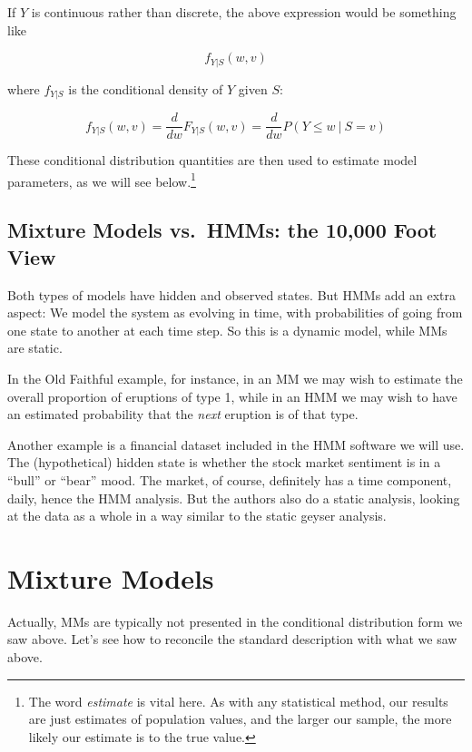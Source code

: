 \documentclass[11pt]{article}
\begin{document}
If $Y$ is continuous rather than discrete, the above expression would be
something like

\begin{equation}
f_{Y|S} (w,v) 
\end{equation}

where $f_{Y|S}$ is the conditional density of $Y$ given $S$:

\begin{equation}
f_{Y|S}(w,v) 
= \frac{d}{dw} F_{Y|S}(w,v) 
= \frac{d}{dw} P(Y \leq w ~|~ S = v)
\end{equation}

These conditional distribution quantities are then used to estimate
model parameters, as we will see below.\footnote{The word
\textit{estimate} is vital here.  As with any statistical method, our
results are just estimates of population values, and the larger our
sample, the more likely our estimate is to the true value.}

\subsection{Mixture Models vs.\ HMMs: the 10,000 Foot View}

Both types of models have hidden and observed states.  But HMMs add an
extra aspect:  We model the system as evolving in time, with
probabilities of going from one state to another at each time step.  So
this is a dynamic model, while MMs are static. 

In the Old Faithful example, for instance, in an MM we may wish to
estimate the overall proportion of eruptions of type 1, while in an
HMM we may wish to have an estimated probability that the \textit{next}
eruption is of that type.

Another example is a financial dataset included in the HMM software we will
use.  The (hypothetical) hidden state is whether the stock market
sentiment is in a ``bull'' or ``bear'' mood.  The market, of course,
definitely has a time component, daily, hence the HMM analysis.  But the
authors also do a static analysis, looking at the data as a whole in a
way similar to the static geyser analysis.

\section{Mixture Models}

Actually, MMs are typically not presented in the conditional distribution
form we saw above.  Let's see how to reconcile the standard description
with what we saw above.
\end{document}
